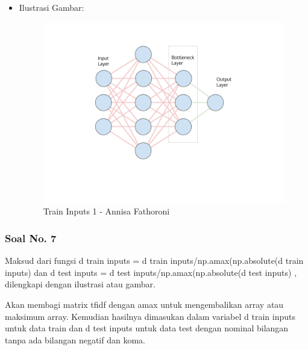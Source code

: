 \begin{itemize}
\item Ilustrasi Gambar:

\begin{figure}[!hbtp]
\centering
\includegraphics[scale=0.3]{figures/Chapter 7/1164067/Teori/Chapter7AnnisaFathoroni6.png}
\caption{Train Inputs 1 - Annisa Fathoroni}
\label{Train Inputs 1 - Annisa Fathoroni}
\end{figure}

\end{itemize}

\subsubsection{Soal No. 7}
Maksud dari fungsi d train inputs = d train inputs/np.amax(np.absolute(d train inputs) dan d test inputs = d test inputs/np.amax(np.absolute(d test inputs) , dilengkapi dengan ilustrasi atau gambar.

Akan membagi matrix tfidf dengan amax untuk mengembalikan array atau maksimum array. Kemudian hasilnya dimasukan dalam variabel d train inputs untuk data train dan d test inputs untuk data test dengan nominal bilangan tanpa ada bilangan negatif dan koma.

